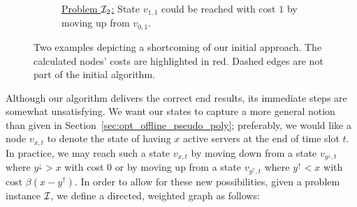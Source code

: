 \begin{exmpl}
\begin{figure}[H]
\begin{subfigure}[b]{0.49\textwidth}
{}
\caption{\underline{Problem $\mathcal{I}_2$:} State $v_{1,1}$ could be reached with cost $1$ by moving up from $v_{0,1}$.}
\end{subfigure}
\caption{Two examples depicting a shortcoming of our initial approach. The calculated nodes' costs are highlighted in red. Dashed edges are not part of the initial algorithm.}
\end{figure}
\end{exmpl}
Although our algorithm delivers the correct end results, its immediate steps are somewhat unsatisfying. We want our states to capture a more general notion than given in Section~\ref{sec:opt_offline_pseudo_poly}; preferably, we would like a node $v_{x,t}$ to denote the state of having $x$ active servers at the end of time slot $t$. In practice, we may reach such a state $v_{x,t}$ by moving down from a state $v_{y^\downarrow,t}$ where $y^\downarrow>x$ with cost $0$ or by moving up from a state $v_{y^\uparrow,t}$ where $y^\uparrow<x$ with cost $\beta(x-y^\uparrow)$. In order to allow for these new possibilities, given a problem instance $\mathcal{I}$, we define a directed, weighted graph as follows:
